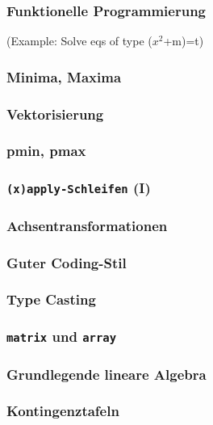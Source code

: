 \documentclass[paper=A4, pagesize, DIV=calc, smallheadings,
fontsize=11pt, expansion=false]{scrreprt}
\begin{document}
\subsubsection*{Funktionelle Programmierung}
(Example: Solve eqs of type ($x^2$+m)=t)

\subsubsection*{Minima, Maxima}

\subsubsection*{Vektorisierung}

\subsubsection*{pmin, pmax}

\subsubsection*{\texttt{(x)apply-Schleifen} (I)}

\subsubsection*{Achsentransformationen}


\subsubsection*{Guter Coding-Stil}

\subsubsection*{Type Casting}

\subsubsection*{\texttt{matrix} und \texttt{array}}

\subsubsection*{Grundlegende lineare Algebra}

\subsubsection*{Kontingenztafeln}
\end{document}
